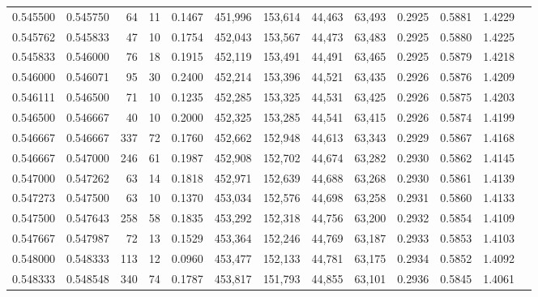 \begin{tabular}{rrrrrrrrrrrrr}
0.545500 & 0.545750 &    64 &  11 &                                     0.1467 & 451,996 & 153,614 &  44,463 &  63,493 & 0.2925 & 0.5881 & 1.4229 \\
0.545762 & 0.545833 &    47 &  10 &                                     0.1754 & 452,043 & 153,567 &  44,473 &  63,483 & 0.2925 & 0.5880 & 1.4225 \\
0.545833 & 0.546000 &    76 &  18 &                                     0.1915 & 452,119 & 153,491 &  44,491 &  63,465 & 0.2925 & 0.5879 & 1.4218 \\
0.546000 & 0.546071 &    95 &  30 &                                     0.2400 & 452,214 & 153,396 &  44,521 &  63,435 & 0.2926 & 0.5876 & 1.4209 \\
0.546111 & 0.546500 &    71 &  10 &                                     0.1235 & 452,285 & 153,325 &  44,531 &  63,425 & 0.2926 & 0.5875 & 1.4203 \\
0.546500 & 0.546667 &    40 &  10 &                                     0.2000 & 452,325 & 153,285 &  44,541 &  63,415 & 0.2926 & 0.5874 & 1.4199 \\
0.546667 & 0.546667 &   337 &  72 &                                     0.1760 & 452,662 & 152,948 &  44,613 &  63,343 & 0.2929 & 0.5867 & 1.4168 \\
0.546667 & 0.547000 &   246 &  61 &                                     0.1987 & 452,908 & 152,702 &  44,674 &  63,282 & 0.2930 & 0.5862 & 1.4145 \\
0.547000 & 0.547262 &    63 &  14 &                                     0.1818 & 452,971 & 152,639 &  44,688 &  63,268 & 0.2930 & 0.5861 & 1.4139 \\
0.547273 & 0.547500 &    63 &  10 &                                     0.1370 & 453,034 & 152,576 &  44,698 &  63,258 & 0.2931 & 0.5860 & 1.4133 \\
0.547500 & 0.547643 &   258 &  58 &                                     0.1835 & 453,292 & 152,318 &  44,756 &  63,200 & 0.2932 & 0.5854 & 1.4109 \\
0.547667 & 0.547987 &    72 &  13 &                                     0.1529 & 453,364 & 152,246 &  44,769 &  63,187 & 0.2933 & 0.5853 & 1.4103 \\
0.548000 & 0.548333 &   113 &  12 &                                     0.0960 & 453,477 & 152,133 &  44,781 &  63,175 & 0.2934 & 0.5852 & 1.4092 \\
0.548333 & 0.548548 &   340 &  74 &                                     0.1787 & 453,817 & 151,793 &  44,855 &  63,101 & 0.2936 & 0.5845 & 1.4061 \\

\end{tabular}
